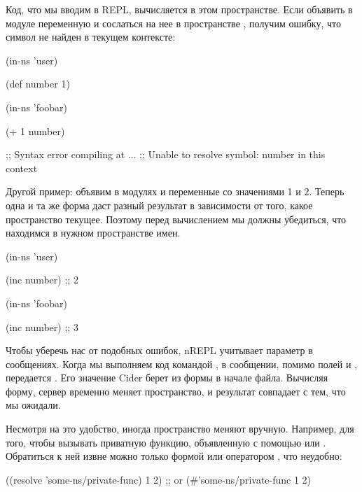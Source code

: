 Код, что мы вводим в REPL, вычисляется в этом пространстве. Если объявить в модуле  переменную  и сослаться на нее в пространстве , получим ошибку, что символ не найден в текущем контексте:

\begin{english}
  \begin{clojure}
(in-ns 'user)

(def number 1)

(in-ns 'foobar)

(+ 1 number)

;; Syntax error compiling at ...
;; Unable to resolve symbol: number in this context
  \end{clojure}
\end{english}

Другой пример: объявим в модулях  и  переменные  со значениями 1 и 2. Теперь одна и та же форма  даст разный результат в зависимости от того, какое пространство текущее. Поэтому перед вычислением мы должны убедиться, что находимся в нужном пространстве имен.

\begin{english}
  \begin{clojure}
(in-ns 'user)

(inc number) ;; 2

(in-ns 'foobar)

(inc number) ;; 3
  \end{clojure}
\end{english}

Чтобы уберечь нас от подобных ошибок, nREPL учитывает параметр  в сообщениях. Когда мы выполняем код командой , в сообщении, помимо полей  и , передается . Его значение Cider берет из формы  в начале файла. Вычисляя форму, сервер временно меняет пространство, и результат совпадает с тем, что мы ожидали.

Несмотря на это удобство, иногда пространство меняют вручную. Например, для того, чтобы вызывать приватную функцию, объявленную с помощью  или . Обратиться к ней извне можно только формой  или оператором , что неудобно:

\begin{english}
  \begin{clojure}
((resolve 'some-ns/private-func) 1 2)
;; or
(#'some-ns/private-func 1 2)
  \end{clojure}
\end{english}

